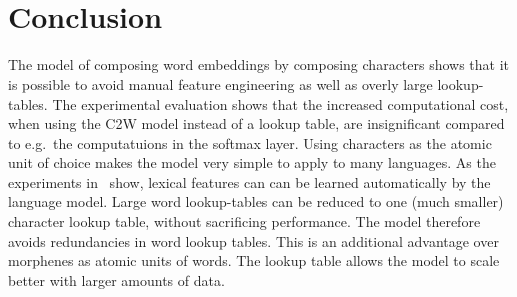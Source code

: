 \documentclass[twoside,11pt,a4paper]{article}
\newcommand*{\Frac}[2]{\frac{\displaystyle #1}{\displaystyle #2}}
\theoremstyle{break}
\begin{document}
\newpage
\ 
\newpage

%
%
%
%
%
\pagestyle{headings}
\tableofcontents
\listoftables
\listoffigures
\newpage
\pagestyle{empty}
\ 
\newpage
\pagestyle{headings}

%
%
%
%










\section{Conclusion}

The model of composing word embeddings by composing characters shows that it is possible to avoid
manual feature engineering as well as overly large lookup-tables. The experimental evaluation
shows that the increased computational cost, when using the C2W model instead of a lookup table, are insignificant
compared to e.g.\ the computatuions in the softmax layer.
Using characters as the atomic unit of choice makes the model very simple to apply to many languages.
As the experiments in~\cite{DBLP:journals/corr/LingLMAADBT15} show, lexical features can
can be learned automatically by the language model. Large word lookup-tables
can be reduced to one (much smaller) character lookup table, without sacrificing performance. 
The model therefore avoids redundancies in word lookup tables. This is an additional advantage over
morphenes as atomic units of words. The lookup table allows the model to scale better with
larger amounts of data.
\end{document}
